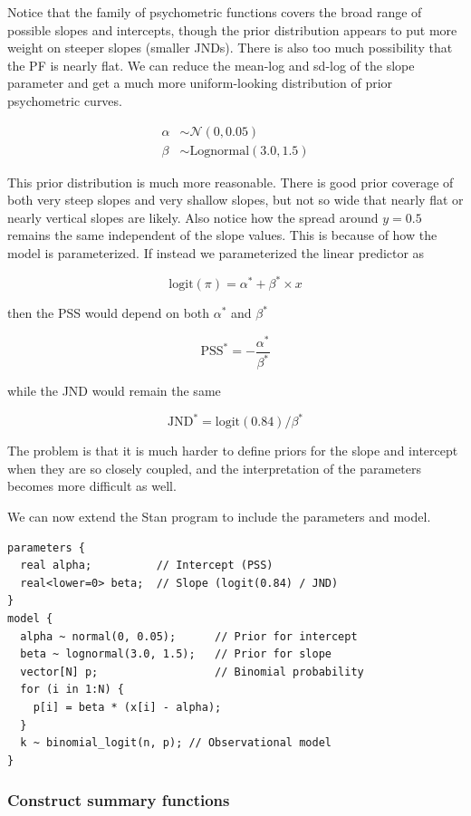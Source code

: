 \documentclass[11pt, oneside, openany]{scrbook}
\begin{document}
Notice that the family of psychometric functions covers the broad range of possible slopes and intercepts, though the prior distribution appears to put more weight on steeper slopes (smaller JNDs). There is also too much possibility that the PF is nearly flat. We can reduce the mean-log and sd-log of the slope parameter and get a much more uniform-looking distribution of prior psychometric curves.

\begin{align*}
\alpha &\sim \mathcal{N}(0, 0.05) \\
\beta &\sim \mathrm{Lognormal}(3.0, 1.5)
\end{align*}

This prior distribution is much more reasonable. There is good prior coverage of both very steep slopes and very shallow slopes, but not so wide that nearly flat or nearly vertical slopes are likely. Also notice how the spread around \(y=0.5\) remains the same independent of the slope values. This is because of how the model is parameterized. If instead we parameterized the linear predictor as

\[
\mathrm{logit}(\pi) = \alpha^* + \beta^* \times x
\]

then the PSS would depend on both \(\alpha^*\) and \(\beta^*\)

\[
\mathrm{PSS}^* = -\frac{\alpha^*}{\beta^*}
\]

while the JND would remain the same

\[
\mathrm{JND}^* = \mathrm{logit}(0.84)/\beta^*
\]

The problem is that it is much harder to define priors for the slope and intercept when they are so closely coupled, and the interpretation of the parameters becomes more difficult as well.

We can now extend the Stan program to include the parameters and model.

\begin{verbatim}
parameters {
  real alpha;          // Intercept (PSS)
  real<lower=0> beta;  // Slope (logit(0.84) / JND)
}
model {
  alpha ~ normal(0, 0.05);      // Prior for intercept
  beta ~ lognormal(3.0, 1.5);   // Prior for slope
  vector[N] p;                  // Binomial probability
  for (i in 1:N) {
    p[i] = beta * (x[i] - alpha);
  }
  k ~ binomial_logit(n, p); // Observational model
}
\end{verbatim}

\hypertarget{construct-summary-functions}{%
\subsubsection{Construct summary functions}\label{construct-summary-functions}}
\end{document}

